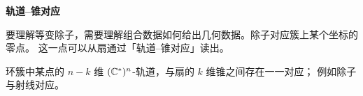 
\medskip\noindent\textbf{轨道–锥对应}\par

要理解等变除子，需要理解组合数据如何给出几何数据。除子对应簇上某个坐标的零点。
这一点可以从扇通过「轨道–锥对应」读出。

\begin{lemma}[轨道–锥对应]\label{lem:orbit-cone}
环簇中某点的 $n-k$ 维 $(\mathbb{C}^*)^n$-轨道，与扇的 $k$ 维锥之间存在一一对应；
例如除子与射线对应。
\end{lemma}


